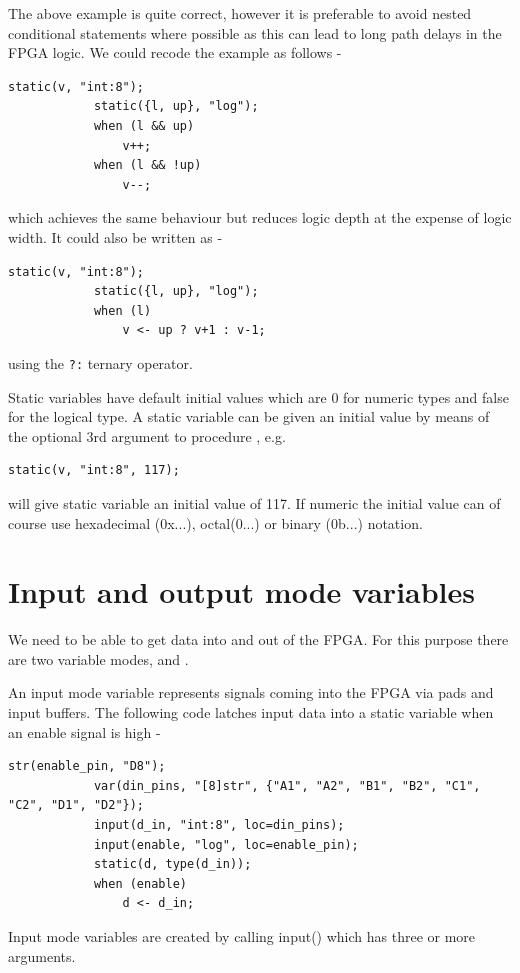         The above example is quite correct, however it is preferable to avoid
        nested conditional statements where possible as this can lead to long
        path delays in the FPGA logic. We could recode the example as follows -
        \begin{lstlisting}[language=threepl]
            static(v, "int:8");
            static({l, up}, "log");
            when (l && up)
                v++;
            when (l && !up)
                v--;
        \end{lstlisting}
        which achieves the same behaviour but reduces logic depth at the expense
        of logic width. It could also be written as -
        \begin{lstlisting}[language=threepl]
            static(v, "int:8");
            static({l, up}, "log");
            when (l)
                v <- up ? v+1 : v-1;
        \end{lstlisting}
        using the \verb'?:' ternary operator.

        Static variables have default initial values which are 0 for numeric types
        and false for the logical type. A static variable can be given an initial
        value by means of the optional 3rd argument to procedure ,
        e.g.
        \begin{lstlisting}[language=threepl]
            static(v, "int:8", 117);
        \end{lstlisting}
        will give static variable  an initial value of 117. If numeric the
        initial value can of course use hexadecimal (0x...), octal(0...) or binary
        (0b...) notation.
 
    \section{Input and output mode variables}

        We need to be able to get data into and out of the FPGA. For this purpose
        there are two variable modes,  and .

        An input mode variable represents signals coming into the FPGA via
        pads and input buffers. The following code latches input data into
        a static variable when an enable signal is high -
        \begin{lstlisting}[language=threepl]
            str(enable_pin, "D8");
            var(din_pins, "[8]str", {"A1", "A2", "B1", "B2", "C1", "C2", "D1", "D2"});
            input(d_in, "int:8", loc=din_pins);
            input(enable, "log", loc=enable_pin);
            static(d, type(d_in));
            when (enable)
                d <- d_in;
        \end{lstlisting}
        Input mode variables are created by calling input() which has three or more
        arguments.

